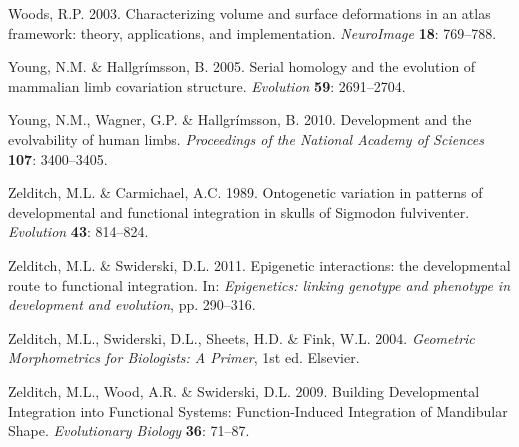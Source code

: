 \documentclass[12pt,]{article}
\begin{document}
Woods, R.P. 2003. Characterizing volume and surface deformations in an
atlas framework: theory, applications, and implementation.
\emph{NeuroImage} \textbf{18}: 769--788.

Young, N.M. \& Hallgrímsson, B. 2005. Serial homology and the evolution
of mammalian limb covariation structure. \emph{Evolution} \textbf{59}:
2691--2704.

Young, N.M., Wagner, G.P. \& Hallgrímsson, B. 2010. Development and the
evolvability of human limbs. \emph{Proceedings of the National Academy
of Sciences} \textbf{107}: 3400--3405.

Zelditch, M.L. \& Carmichael, A.C. 1989. Ontogenetic variation in
patterns of developmental and functional integration in skulls of
Sigmodon fulviventer. \emph{Evolution} \textbf{43}: 814--824.

Zelditch, M.L. \& Swiderski, D.L. 2011. Epigenetic interactions: the
developmental route to functional integration. In: \emph{Epigenetics:
linking genotype and phenotype in development and evolution}, pp.
290--316.

Zelditch, M.L., Swiderski, D.L., Sheets, H.D. \& Fink, W.L. 2004.
\emph{Geometric Morphometrics for Biologists: A Primer}, 1st ed.
Elsevier.

Zelditch, M.L., Wood, A.R. \& Swiderski, D.L. 2009. Building
Developmental Integration into Functional Systems: Function-Induced
Integration of Mandibular Shape. \emph{Evolutionary Biology}
\textbf{36}: 71--87.
\end{document}
